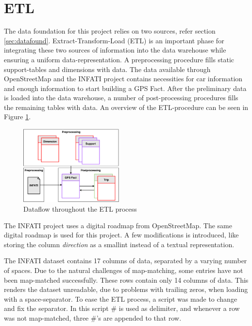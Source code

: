 \section{ETL}\label{sec:ETL}
The data foundation for this project relies on two sources, refer section \ref{sec:datafound}. Extract-Transform-Load (ETL) is an important phase for integrating these two sources of information into the data warehouse while ensuring a uniform data-representation. A preprocessing procedure fills static support-tables and dimensions with data. The data available through OpenStreetMap and the INFATI project contains necessities for car information and enough information to start building a GPS Fact. After the preliminary data is loaded into the data warehouse, a number of post-processing procedures fills the remaining tables with data. An overview of the ETL-procedure can be seen in Figure \ref{fig:etl}.

\begin{figure}[tb]
\centering
\includegraphics[width=0.465\textwidth]{Pictures/ETL}
\caption{Dataflow throughout the ETL process}
\label{fig:etl}
\end{figure}

The INFATI project\cite{art:INFATI} uses a digital roadmap from OpenStreetMap\cite{osm}. The same digital roadmap is used for this project. A few modifications is introduced, like storing the column \textit{direction} as a smallint instead of a textual representation. 

The INFATI dataset\cite{art:INFATI} contains 17 columns of data, separated by a varying number of spaces. Due to the natural challenges of map-matching, some entries have not been map-matched successfully. These rows contain only 14 columns of data. This renders the dataset unreadable, due to problems with trailing zeros, when loading with a space-separator. To ease the ETL process, a script was made to change and fix the separator. In this script \# is used as delimiter, and whenever a row was not map-matched, three \#'s are appended to that row.

